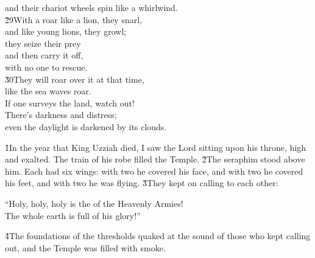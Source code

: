 \begin{poetry}
\poemll    and their chariot wheels spin like a whirlwind. \\
\poeml \v{29}With a roar like a lion, they snarl, \\
\poemll    and like young lions, they growl; \\
\poeml they seize their prey \\
\poemll    and then carry it off, \\
\poemlll       with no one to rescue. \\
\poeml \v{30}They will roar over it at that time, \\
\poemll    like the sea waves roar. \\
\poeml If one surveys the land, watch out! \\
\poemll    There's darkness and distress; \\
\poemlll       even the daylight is darkened by its clouds.
\end{poetry}

\v{1}In the year that King Uzziah died, I saw the Lord sitting upon his throne, high and exalted. The train of his robe filled the Temple. \v{2}The seraphim stood above him. Each had six wings: with two he covered his face, and with two he covered his feet, and with two he was flying. \v{3}They kept on calling to each other:

\begin{poetry}
\poeml ``Holy, holy, holy is the  of the Heavenly Armies! \\
\poemll    The whole earth is full of his glory!''
\end{poetry}

\v{4}The foundations of the thresholds quaked at the sound of those who kept calling out, and the Temple was filled with smoke.

